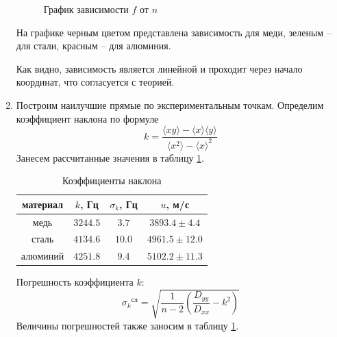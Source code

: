 \documentclass[a4paper,12pt]{article}
\begin{document}
\begin{enumerate}
\begin{figure}[h!]
			\caption{График зависимости $f$ от $n$}
			\label{graph1}
		\end{figure}

		На графике черным цветом представлена зависимость для меди, зеленым -- для стали, красным -- для алюминия.
		
		Как видно, зависимость является линейной и проходит через начало координат, что согласуется с теорией.

		\item Построим наилучшие прямые по экспериментальным точкам. Определим коэффициент наклона по формуле
		$$
		k = \frac{\langle x y \rangle - \langle x \rangle \langle y \rangle}{\langle x^2 \rangle - {\langle x \rangle} ^2}
		$$
		Занесем рассчитанные значения в таблицу \ref{table4}.
		\begin{table}[h]
			\centering
			\begin{tabular}{|c|c|c|c|} \hline
				материал & $k$, Гц & $\sigma_k$, Гц & $u$, м/с \\ \hline
				медь & $3244.5$ & $3.7$ & $3893.4 \pm 4.4$ \\ \hline
				сталь & $4134.6$ & $10.0$ & $4961.5 \pm 12.0$ \\ \hline
				алюминий & $4251.8$ & $9.4$ & $5102.2 \pm 11.3$ \\ \hline
			\end{tabular}
			\caption{Коэффициенты наклона}
			\label{table4}
		\end{table}

		Погрешность коэффициента $k$:
		$$
		{\sigma_k}^{\text{сл}}= \sqrt{\frac{1}{n-2}\left(\frac{D_{yy}}{D_{xx}} - k^2 \right)}
		$$
		Величины погрешностей также заносим в таблицу \ref{table4}.


\end{enumerate}
\end{document}
